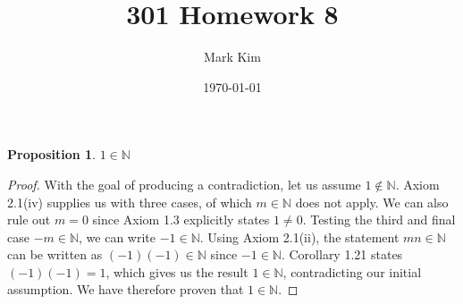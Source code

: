 \documentclass[12pt]{amsart}
\title{301 Homework 8}
\author{Mark Kim}
\date{\today}
\newcommand{\N}{\mathbb{N}}
\newtheorem*{proposition}{Proposition}
\begin{document}
\maketitle

\begin{proposition}
$1\in\N$
\end{proposition}

\begin{proof}
With the goal of producing a contradiction, let us assume $1\notin\N$.  Axiom 2.1(iv) supplies us with three cases, of which $m\in\N$ does not apply.  We can also rule out $m=0$ since Axiom 1.3 explicitly states $1\neq0$.  Testing the third and final case $-m\in\N$, we can write $-1\in\N$.  Using Axiom 2.1(ii), the statement $mn\in\N$ can be written as $(-1)(-1)\in\N$ since $-1\in\N$.  Corollary 1.21 states $(-1)(-1)=1$, which gives us the result $1\in\N$, contradicting our initial assumption.  We have therefore proven that $1\in\N$.
\end{proof}
\end{document}

